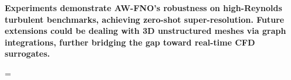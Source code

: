 \documentclass[11pt,a4paper]{article}
\begin{document}
\textbf{Experiments demonstrate AW-FNO's robustness on high-Reynolds turbulent benchmarks, achieving zero-shot super-resolution. Future extensions could be dealing with 3D unstructured meshes via graph integrations, further bridging the gap toward real-time CFD surrogates.}






\bibspacing=
 

\end{document}
